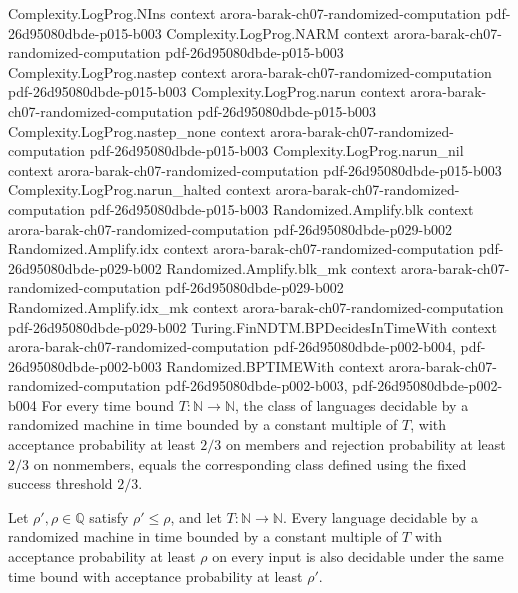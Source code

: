 \begin{theorem}
\proofstep
  {Complexity.LogProg.NIns}
  {context}
  {arora-barak-ch07-randomized-computation}
  {pdf-26d95080dbde-p015-b003}
\proofstep
  {Complexity.LogProg.NARM}
  {context}
  {arora-barak-ch07-randomized-computation}
  {pdf-26d95080dbde-p015-b003}
\proofstep
  {Complexity.LogProg.nastep}
  {context}
  {arora-barak-ch07-randomized-computation}
  {pdf-26d95080dbde-p015-b003}
\proofstep
  {Complexity.LogProg.narun}
  {context}
  {arora-barak-ch07-randomized-computation}
  {pdf-26d95080dbde-p015-b003}
\proofstep
  {Complexity.LogProg.nastep_none}
  {context}
  {arora-barak-ch07-randomized-computation}
  {pdf-26d95080dbde-p015-b003}
\proofstep
  {Complexity.LogProg.narun_nil}
  {context}
  {arora-barak-ch07-randomized-computation}
  {pdf-26d95080dbde-p015-b003}
\proofstep
  {Complexity.LogProg.narun_halted}
  {context}
  {arora-barak-ch07-randomized-computation}
  {pdf-26d95080dbde-p015-b003}
\proofstep
  {Randomized.Amplify.blk}
  {context}
  {arora-barak-ch07-randomized-computation}
  {pdf-26d95080dbde-p029-b002}
\proofstep
  {Randomized.Amplify.idx}
  {context}
  {arora-barak-ch07-randomized-computation}
  {pdf-26d95080dbde-p029-b002}
\proofstep
  {Randomized.Amplify.blk_mk}
  {context}
  {arora-barak-ch07-randomized-computation}
  {pdf-26d95080dbde-p029-b002}
\proofstep
  {Randomized.Amplify.idx_mk}
  {context}
  {arora-barak-ch07-randomized-computation}
  {pdf-26d95080dbde-p029-b002}
\proofstep
  {Turing.FinNDTM.BPDecidesInTimeWith}
  {context}
  {arora-barak-ch07-randomized-computation}
  {pdf-26d95080dbde-p002-b004,
    pdf-26d95080dbde-p002-b003}
\proofstep
  {Randomized.BPTIMEWith}
  {context}
  {arora-barak-ch07-randomized-computation}
  {pdf-26d95080dbde-p002-b003,
    pdf-26d95080dbde-p002-b004}
For every time bound $T : \mathbb{N} \to \mathbb{N}$, the class of languages decidable
by a randomized machine in time bounded by a constant multiple of $T$, with acceptance
probability at least $2/3$ on members and rejection probability at least $2/3$ on
nonmembers, equals the corresponding class defined using the fixed success threshold
$2/3$.
\end{theorem}

\begin{theorem}
\label{Randomized.BPTIMEWith_anti}
\leanok
{}
Let $\rho',\rho\in\mathbb{Q}$ satisfy $\rho'\le\rho$, and let
$T:\mathbb{N}\to\mathbb{N}$. Every language decidable by a randomized machine in time
bounded by a constant multiple of $T$ with acceptance probability at least $\rho$ on
every input is also decidable under the same time bound with acceptance probability at
least $\rho'$.
\end{theorem}

